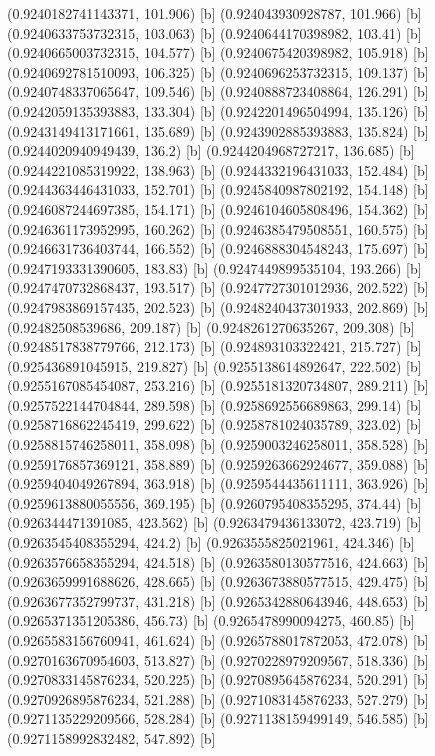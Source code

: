 {{{(0.9240182741143371, 101.906) [b] 
(0.924043930928787, 101.966) [b] 
(0.9240633753732315, 103.063) [b] 
(0.9240644170398982, 103.41) [b] 
(0.9240665003732315, 104.577) [b] 
(0.9240675420398982, 105.918) [b] 
(0.9240692781510093, 106.325) [b] 
(0.9240696253732315, 109.137) [b] 
(0.9240748337065647, 109.546) [b] 
(0.9240888723408864, 126.291) [b] 
(0.9242059135393883, 133.304) [b] 
(0.9242201496504994, 135.126) [b] 
(0.9243149413171661, 135.689) [b] 
(0.9243902885393883, 135.824) [b] 
(0.9244020940949439, 136.2) [b] 
(0.9244204968727217, 136.685) [b] 
(0.9244221085319922, 138.963) [b] 
(0.9244332196431033, 152.484) [b] 
(0.9244363446431033, 152.701) [b] 
(0.9245840987802192, 154.148) [b] 
(0.9246087244697385, 154.171) [b] 
(0.9246104605808496, 154.362) [b] 
(0.9246361173952995, 160.262) [b] 
(0.9246385479508551, 160.575) [b] 
(0.9246631736403744, 166.552) [b] 
(0.9246888304548243, 175.697) [b] 
(0.9247193331390605, 183.83) [b] 
(0.9247449899535104, 193.266) [b] 
(0.9247470732868437, 193.517) [b] 
(0.9247727301012936, 202.522) [b] 
(0.9247983869157435, 202.523) [b] 
(0.9248240437301933, 202.869) [b] 
(0.92482508539686, 209.187) [b] 
(0.9248261270635267, 209.308) [b] 
(0.9248517838779766, 212.173) [b] 
(0.924893103322421, 215.727) [b] 
(0.925436891045915, 219.827) [b] 
(0.9255138614892647, 222.502) [b] 
(0.9255167085454087, 253.216) [b] 
(0.9255181320734807, 289.211) [b] 
(0.9257522144704844, 289.598) [b] 
(0.9258692556689863, 299.14) [b] 
(0.9258716862245419, 299.622) [b] 
(0.9258781024035789, 323.02) [b] 
(0.9258815746258011, 358.098) [b] 
(0.9259003246258011, 358.528) [b] 
(0.9259176857369121, 358.889) [b] 
(0.9259263662924677, 359.088) [b] 
(0.9259404049267894, 363.918) [b] 
(0.9259544435611111, 363.926) [b] 
(0.9259613880055556, 369.195) [b] 
(0.9260795408355295, 374.44) [b] 
(0.926344471391085, 423.562) [b] 
(0.9263479436133072, 423.719) [b] 
(0.9263545408355294, 424.2) [b] 
(0.9263555825021961, 424.346) [b] 
(0.9263576658355294, 424.518) [b] 
(0.9263580130577516, 424.663) [b] 
(0.9263659991688626, 428.665) [b] 
(0.9263673880577515, 429.475) [b] 
(0.9263677352799737, 431.218) [b] 
(0.9265342880643946, 448.653) [b] 
(0.9265371351205386, 456.73) [b] 
(0.9265478990094275, 460.85) [b] 
(0.9265583156760941, 461.624) [b] 
(0.9265788017872053, 472.078) [b] 
(0.9270163670954603, 513.827) [b] 
(0.9270228979209567, 518.336) [b] 
(0.9270833145876234, 520.225) [b] 
(0.9270895645876234, 520.291) [b] 
(0.9270926895876234, 521.288) [b] 
(0.9271083145876233, 527.279) [b] 
(0.9271135229209566, 528.284) [b] 
(0.9271138159499149, 546.585) [b] 
(0.9271158992832482, 547.892) [b] 
}}}
